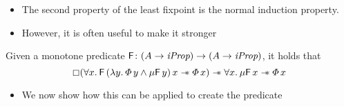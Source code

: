 \documentclass[thesis.tex]{subfiles}
\begin{document}
\begin{itemize}
    \item The second property of the least fixpoint is the normal induction property.
    \item However, it is often useful to make it stronger
\end{itemize}
\begin{lemma}
    Given a monotone predicate $\textsf{\upshape F}\colon (A \to \textit{iProp}) \to (A \to \textit{iProp})$, it holds that
    \[\always(\All\var.\hopred\,(\Lam\varB. \pred\,\varB \land \lfp\hopred\,\varB)\,\var \wand \pred\,\var) \wand \All\var. \lfp\hopred\,\var \wand \pred\,\var\]
\end{lemma}
\begin{itemize}
    \item We now show how this can be applied to create the \isMLL predicate
\end{itemize}
\end{document}
